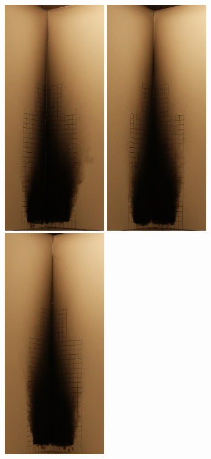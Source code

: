 \documentclass[twoside]{uocthesis}
\begin{document}
{\begin{figure}[p]
	\includegraphics[width=1.7in]{../Figures/GBPUF11_Corner}
	\includegraphics[width=1.7in]{../Figures/GBPUF12_Corner}
	\includegraphics[width=1.7in]{../Figures/GBPUF13_Corner} \\


\end{figure}}
\end{document}
